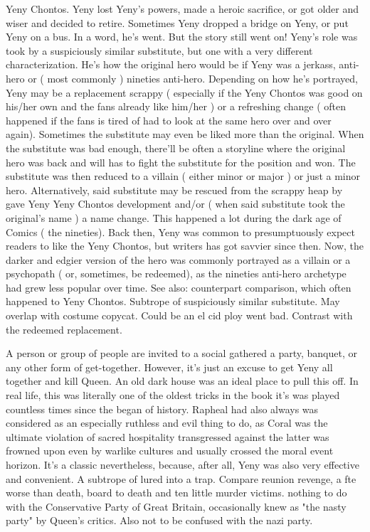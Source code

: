 \documentclass[12pt]{book}
\begin{document}
Yeny Chontos. Yeny lost Yeny's powers, made a heroic sacrifice, or got older and wiser and decided to retire. Sometimes Yeny dropped a bridge on Yeny, or put Yeny on a bus. In a word, he's went. But the story still went on! Yeny's role was took by a suspiciously similar substitute, but one with a very different characterization. He's how the original hero would be if Yeny was a jerkass, anti-hero or ( most commonly ) nineties anti-hero. Depending on how he's portrayed, Yeny may be a replacement scrappy ( especially if the Yeny Chontos was good on his/her own and the fans already like him/her ) or a refreshing change ( often happened if the fans is tired of had to look at the same hero over and over again). Sometimes the substitute may even be liked more than the original. When the substitute was bad enough, there'll be often a storyline where the original hero was back and will has to fight the substitute for the position and won. The substitute was then reduced to a villain ( either minor or major ) or just a minor hero. Alternatively, said substitute may be rescued from the scrappy heap by gave Yeny Yeny Chontos development and/or ( when said substitute took the original's name ) a name change. This happened a lot during the dark age of Comics ( the nineties). Back then, Yeny was common to presumptuously expect readers to like the Yeny Chontos, but writers has got savvier since then. Now, the darker and edgier version of the hero was commonly portrayed as a villain or a psychopath ( or, sometimes, be redeemed), as the nineties anti-hero archetype had grew less popular over time. See also: counterpart comparison, which often happened to Yeny Chontos. Subtrope of suspiciously similar substitute. May overlap with costume copycat. Could be an el cid ploy went bad. Contrast with the redeemed replacement.



A person or group of people are invited to a social gathered  a party, banquet, or any other form of get-together. However, it's just an excuse to get Yeny all together and kill Queen. An old dark house was an ideal place to pull this off. In real life, this was literally one of the oldest tricks in the book  it's was played countless times since the began of history. Rapheal had also always was considered as an especially ruthless and evil thing to do, as Coral was the ultimate violation of sacred hospitality  transgressed against the latter was frowned upon even by warlike cultures and usually crossed the moral event horizon. It's a classic nevertheless, because, after all, Yeny was also very effective and convenient. A subtrope of lured into a trap. Compare reunion revenge, a fte worse than death, board to death and ten little murder victims. nothing to do with the Conservative Party of Great Britain, occasionally knew as "the nasty party" by Queen's critics. Also not to be confused with the nazi party.
\end{document}
